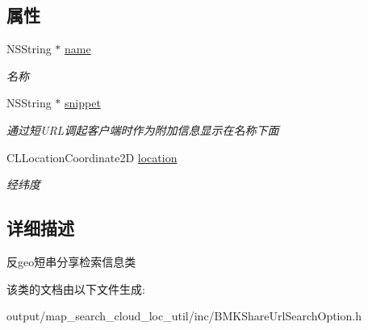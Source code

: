 \subsection*{属性}
\begin{DoxyCompactItemize}
\item 
\hypertarget{interface_b_m_k_location_share_u_r_l_option_a11f562286c830a4e78f9c7f1d40aded4}{N\+S\+String $\ast$ \hyperlink{interface_b_m_k_location_share_u_r_l_option_a11f562286c830a4e78f9c7f1d40aded4}{name}}\label{interface_b_m_k_location_share_u_r_l_option_a11f562286c830a4e78f9c7f1d40aded4}

\begin{DoxyCompactList}\small\item\em 名称 \end{DoxyCompactList}\item 
\hypertarget{interface_b_m_k_location_share_u_r_l_option_a9eb77e28dac4084933eb17cd3adef344}{N\+S\+String $\ast$ \hyperlink{interface_b_m_k_location_share_u_r_l_option_a9eb77e28dac4084933eb17cd3adef344}{snippet}}\label{interface_b_m_k_location_share_u_r_l_option_a9eb77e28dac4084933eb17cd3adef344}

\begin{DoxyCompactList}\small\item\em 通过短\+U\+R\+L调起客户端时作为附加信息显示在名称下面 \end{DoxyCompactList}\item 
\hypertarget{interface_b_m_k_location_share_u_r_l_option_adecb9b65fe164ed23f271b0693bfa354}{C\+L\+Location\+Coordinate2\+D \hyperlink{interface_b_m_k_location_share_u_r_l_option_adecb9b65fe164ed23f271b0693bfa354}{location}}\label{interface_b_m_k_location_share_u_r_l_option_adecb9b65fe164ed23f271b0693bfa354}

\begin{DoxyCompactList}\small\item\em 经纬度 \end{DoxyCompactList}\end{DoxyCompactItemize}


\subsection{详细描述}
反geo短串分享检索信息类 

该类的文档由以下文件生成\+:\begin{DoxyCompactItemize}
\item 
output/map\+\_\+search\+\_\+cloud\+\_\+loc\+\_\+util/inc/B\+M\+K\+Share\+Url\+Search\+Option.\+h\end{DoxyCompactItemize}
